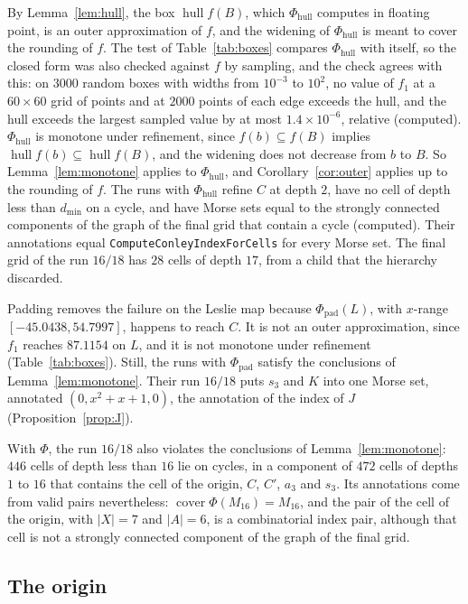 \documentclass[11pt]{article}
\theoremstyle{plain}
\theoremstyle{definition}
\theoremstyle{remark}
\DeclareMathOperator{\cover}{cover}
\DeclareMathOperator{\hull}{hull}
\newcommand{\dmin}{d_{\min}}
\newcommand{\Phipad}{\Phi_{\mathrm{pad}}}
\newcommand{\Phihull}{\Phi_{\mathrm{hull}}}
\newcommand{\code}[1]{\texttt{#1}}
\begin{document}
By Lemma~\ref{lem:hull}, the box $\hull f(B)$, which $\Phihull$ computes in floating point, is an outer approximation of $f$, and the widening of $\Phihull$ is meant to cover the rounding of $f$. The test of Table~\ref{tab:boxes} compares $\Phihull$ with itself, so the closed form was also checked against $f$ by sampling, and the check agrees with this: on $3000$ random boxes with widths from $10^{-3}$ to $10^{2}$, no value of $f_1$ at a $60\times60$ grid of points and at $2000$ points of each edge exceeds the hull, and the hull exceeds the largest sampled value by at most $1.4\times10^{-6}$, relative (computed). $\Phihull$ is monotone under refinement, since $f(b)\subseteq f(B)$ implies $\hull f(b)\subseteq\hull f(B)$, and the widening does not decrease from $b$ to $B$. So Lemma~\ref{lem:monotone} applies to $\Phihull$, and Corollary~\ref{cor:outer} applies up to the rounding of $f$. The runs with $\Phihull$ refine $C$ at depth $2$, have no cell of depth less than $\dmin$ on a cycle, and have Morse sets equal to the strongly connected components of the graph of the final grid that contain a cycle (computed). Their annotations equal \code{ComputeConleyIndexForCells} for every Morse set. The final grid of the run $16/18$ has $28$ cells of depth $17$, from a child that the hierarchy discarded.

Padding removes the failure on the Leslie map because $\Phipad(L)$, with $x$-range $[-45.0438,54.7997]$, happens to reach $C$. It is not an outer approximation, since $f_1$ reaches $87.1154$ on $L$, and it is not monotone under refinement (Table~\ref{tab:boxes}). Still, the runs with $\Phipad$ satisfy the conclusions of Lemma~\ref{lem:monotone}. Their run $16/18$ puts $s_3$ and $K$ into one Morse set, annotated $(0,x^2+x+1,0)$, the annotation of the index of $J$ (Proposition~\ref{prop:J}).

With $\Phi$, the run $16/18$ also violates the conclusions of Lemma~\ref{lem:monotone}: $446$ cells of depth less than $16$ lie on cycles, in a component of $472$ cells of depths $1$ to $16$ that contains the cell of the origin, $C$, $C'$, $a_3$ and $s_3$. Its annotations come from valid pairs nevertheless: $\cover\Phi(M_{16})=M_{16}$, and the pair of the cell of the origin, with $|X|=7$ and $|A|=6$, is a combinatorial index pair, although that cell is not a strongly connected component of the graph of the final grid.

\subsection{The origin}\label{sec:origin}
\end{document}
